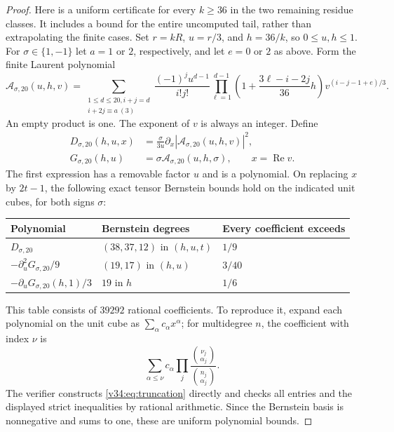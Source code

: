 \documentclass[UTF8,11pt]{ctexart}
\theoremstyle{definition}
\numberwithin{equation}{section}
\DeclareMathOperator{\Rea}{Re}\DeclareMathOperator{\Ima}{Im}
\begin{document}
\begin{proof}
Here is a uniform certificate for every $k\ge36$ in the two
remaining residue classes. It includes a bound for the entire
uncomputed tail, rather than extrapolating the finite cases.
Set $r=kR$, $u=r/3$, and $h=36/k$, so $0\le u,h\le1$.
For $\sigma\in\{1,-1\}$ let $a=1$ or $2$, respectively, and
let $e=0$ or $2$ as above. Form the finite Laurent polynomial
\begin{equation}\label{v34:eq:truncation}
 \mathcal A_{\sigma,20}(u,h,v)=
 \sum_{\substack{1\le d\le20, i+j=d\\i+2j\equiv a\ (3)}}
 \frac{(-1)^j u^{d-1}}{i!j!}
 \prod_{\ell=1}^{d-1}
 \left(1+\frac{3\ell-i-2j}{36}h\right)
 v^{(i-j-1+e)/3}.
\end{equation}
An empty product is one. The exponent of $v$ is always an
integer. Define
\begin{align*}
 D_{\sigma,20}(h,u,x)
   &=\frac{\sigma}{3u}\partial_x
                   |\mathcal A_{\sigma,20}(u,h,v)|^2,\\
 G_{\sigma,20}(h,u)
   &=\sigma\mathcal A_{\sigma,20}(u,h,\sigma),
                   \qquad x=\Rea v.
\end{align*}
The first expression has a removable factor $u$ and is a
polynomial. On replacing $x$ by $2t-1$, the following exact
tensor Bernstein bounds hold on the indicated unit cubes,
for both signs $\sigma$:
\begin{center}
\begin{tabular}{@{}lll@{}}
\toprule
Polynomial & Bernstein degrees & Every coefficient exceeds\\
\midrule
$D_{\sigma,20}$ & $(38,37,12)$ in $(h,u,t)$ & $1/9$\\
$-\partial_u^2G_{\sigma,20}/9$ & $(19,17)$ in $(h,u)$ & $3/40$\\
$-\partial_uG_{\sigma,20}(h,1)/3$ & $19$ in $h$ & $1/6$\\
\bottomrule
\end{tabular}
\end{center}
This table consists of $39292$ rational coefficients. To
reproduce it, expand each polynomial on the unit cube as
$\sum_\alpha c_\alpha x^\alpha$; for multidegree $n$, the
coefficient with index $\nu$ is
\[
 \sum_{\alpha\le\nu}c_\alpha
       \prod_j\frac{\binom{\nu_j}{\alpha_j}}{\binom{n_j}{\alpha_j}}.
\]
The verifier constructs \eqref{v34:eq:truncation} directly and
checks all entries and the displayed strict inequalities by
rational arithmetic. Since the Bernstein basis is nonnegative
and sums to one, these are uniform polynomial bounds.


\end{proof}
\end{document}
